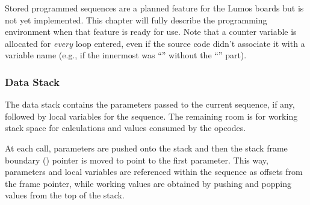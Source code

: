 \documentclass[letterpaper,twoside,onecolumn,openright,final]{memoir}
\begin{document}
\begin{NotImplemented*}{Stored programmed sequences are a planned feature for the Lumos boards but is not
yet implemented.  This chapter will fully describe the programming environment when that feature is
ready for use.}
Note that a counter variable is allocated for \emph{every} loop entered,
even if the source code didn't associate it with a variable name
(e.g., if the innermost was ``'' without the 
``'' part).

\subsubsection{Data Stack}
The data stack contains the parameters passed to the current
sequence, if any, followed by local variables for the sequence.
The remaining room is for working stack space for calculations
and values consumed by the opcodes.

At each call, parameters are pushed onto the stack and then the
stack frame boundary () pointer is moved to 
point to the first parameter.
This way, parameters and local variables are referenced within the
sequence as offsets from the frame pointer, while working values
are obtained by pushing and popping values from the top of the stack.


\end{NotImplemented*}
\end{document}
